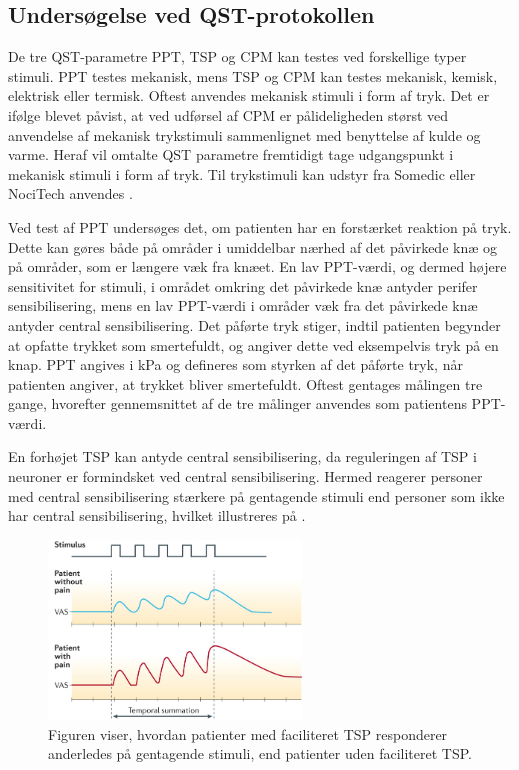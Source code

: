 \subsection{Undersøgelse ved QST-protokollen}
De tre QST-parametre PPT, TSP og CPM kan testes ved forskellige typer stimuli. PPT testes mekanisk, mens TSP og CPM kan testes mekanisk, kemisk, elektrisk eller termisk. Oftest anvendes mekanisk stimuli i form af tryk. \citep{Yarnitsky2006} \citep{Suokas2012} Det er ifølge  blevet påvist, at ved udførsel af CPM er pålideligheden størst ved anvendelse af mekanisk trykstimuli sammenlignet med benyttelse af kulde og varme. Heraf vil omtalte QST parametre fremtidigt tage udgangspunkt i mekanisk stimuli i form af tryk. Til trykstimuli kan udstyr fra Somedic eller NociTech anvendes \citep{Petersen2016} \citep{Wylde2015b}. 

Ved test af PPT undersøges det, om patienten har en forstærket reaktion på tryk. Dette kan gøres både på områder i umiddelbar nærhed af det påvirkede knæ og på områder, som er længere væk fra knæet. En lav PPT-værdi, og dermed højere sensitivitet for stimuli, i området omkring det påvirkede knæ antyder perifer sensibilisering, mens en lav PPT-værdi i områder væk fra det påvirkede knæ antyder central sensibilisering. \citep{Suokas2012} Det påførte tryk stiger, indtil patienten begynder at opfatte trykket som smertefuldt, og angiver dette ved eksempelvis tryk på en knap. PPT angives i kPa og defineres som styrken af det påførte tryk, når patienten angiver, at trykket bliver smertefuldt. Oftest gentages målingen tre gange, hvorefter gennemsnittet af de tre målinger anvendes som patientens PPT-værdi. \citep{Petersen2015} \citep{Wylde2015b} 

En forhøjet TSP kan antyde central sensibilisering, da reguleringen af TSP i neuroner er formindsket ved central sensibilisering. \citep{Arendt-Nielsen2015b} Hermed reagerer personer med central sensibilisering stærkere på gentagende stimuli end personer som ikke har central sensibilisering, hvilket illustreres på . \citep{Arendt-Nielsen2015b} 

\begin{figure}[H] 
	\begin{center}
		\includegraphics[width=0.6\textwidth]{figures/dHTAanalyse/TSP_rask_syg.jpg}
	\end{center}
	\caption{Figuren viser, hvordan patienter med faciliteret TSP responderer anderledes på gentagende stimuli, end patienter uden faciliteret TSP. \citep{Reynolds2016}} 
	\label{fig:TSP_rask_syg} 
\end{figure} \vspace{-.25cm}

